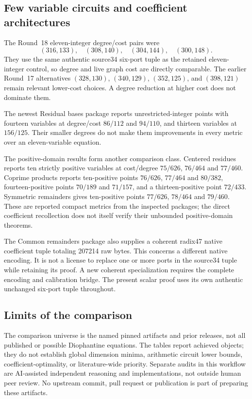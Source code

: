 \subsection{Few variable circuits and coefficient architectures}
The Round~18 eleven-integer degree/cost pairs were
\[
 (316,133),\quad(308,140),\quad(304,144),\quad(300,148).
\]
They use the same authentic source34 six-port tuple as the retained eleven-integer
control, so degree and live graph cost are directly comparable.
The earlier Round~17 alternatives $(328,130)$, $(340,129)$, $(352,125)$,
and $(398,121)$ remain relevant lower-cost choices. A degree reduction at
higher cost does not dominate them.

The newest Residual bases package reports unrestricted-integer points
with fourteen variables at degree/cost $86/112$ and $94/110$, and thirteen
variables at $156/125$. Their smaller degrees do not make them
improvements in every metric over an eleven-variable equation.

The positive-domain results form another comparison class. Centered residues
reports ten strictly positive variables at cost/degree $75/626$, $76/464$
and $77/460$. Coprime products reports ten-positive points $76/626$,
$77/464$ and $80/382$, fourteen-positive points $70/189$ and $71/157$,
and a thirteen-positive point $72/433$. Symmetric remainders gives ten-positive points $77/626$, $78/464$
and $79/460$. These are reported compact metrics from the inspected packages;
the direct coefficient recollection does not itself verify their unbounded
positive-domain theorems.

The Common remainders package also supplies a coherent radix47 native
coefficient tuple totaling 207214 raw bytes. This concerns a different
native encoding. It is not a license to replace one or more ports in the
source34 tuple while retaining its proof. A new coherent specialization
requires the complete encoding and calibration bridge. The present scalar
proof uses its own authentic unchanged six-port tuple throughout.

\subsection{Limits of the comparison}
The comparison universe is the named pinned artifacts and prior releases,
not all published or possible Diophantine equations. The tables report
achieved objects; they do not establish global dimension minima, arithmetic
circuit lower bounds, coefficient-optimality, or literature-wide priority.
Separate audits in this workflow are AI-assisted independent reasoning and
implementations, not outside human peer review. No upstream commit, pull
request or publication is part of preparing these artifacts.
